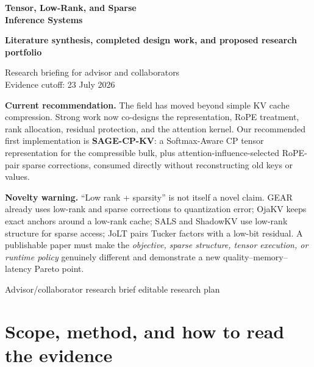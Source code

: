 \documentclass[10pt]{article}
\begin{document}

\begin{titlepage}
\centering
\vspace*{0.8cm}
{\Huge\bfseries\color{accent} Tensor, Low-Rank, and Sparse\\[3pt]Inference Systems\par}
\vspace{0.35cm}
{\Large\bfseries Literature synthesis, completed design work, and proposed research portfolio\par}
\vspace{0.6cm}
\large Research briefing for advisor and collaborators\\[2pt]
Evidence cutoff: 23 July 2026\par
\vspace{0.8cm}
\begin{tcolorbox}[colback=soft,colframe=accent,width=.94\textwidth,arc=3pt]
\small
\textbf{Current recommendation.} The field has moved beyond simple KV cache compression. Strong work
now co-designs the representation, RoPE treatment, rank allocation, residual protection, and the
attention kernel. Our recommended first implementation is \textbf{SAGE-CP-KV}: a
Softmax-Aware CP tensor representation for the compressible bulk, plus attention-influence-selected
RoPE-pair sparse corrections, consumed directly without reconstructing old keys or values.
\end{tcolorbox}
\vspace{0.55cm}
\begin{tcolorbox}[colback=warm,colframe=orange,width=.94\textwidth,arc=3pt]
\small
\textbf{Novelty warning.} ``Low rank + sparsity'' is not itself a novel claim. GEAR already uses
low-rank and sparse corrections to quantization error; OjaKV keeps exact anchors around a low-rank
cache; SALS and ShadowKV use low-rank structure for sparse access; JoLT pairs Tucker factors with a
low-bit residual. A publishable paper must make the \emph{objective, sparse structure, tensor
execution, or runtime policy} genuinely different and demonstrate a new quality--memory--latency
Pareto point.
\end{tcolorbox}
\vfill
{\normalsize Advisor/collaborator research brief \;\textbullet\; editable research plan\par}
\end{titlepage}

\setcounter{page}{2}
\tableofcontents
\newpage
{}

\section{Scope, method, and how to read the evidence}
\end{document}
